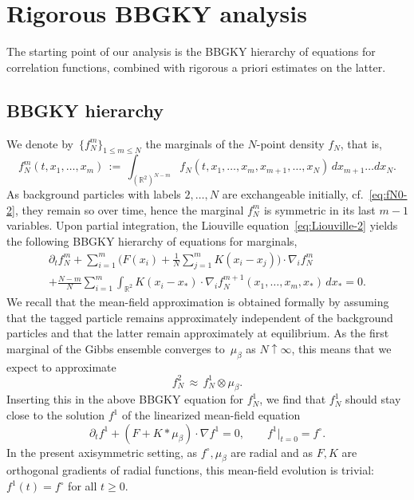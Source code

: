 \documentclass[a4paper,11pt,reqno,noindent]{amsart}
\theoremstyle{plain}
\numberwithin{equation}{section}
\newcommand{\R}{\mathbb R}
\newcommand{\3}{|\!|\!|}
\begin{document}
\section{Rigorous BBGKY analysis}

The starting point of our analysis is the BBGKY hierarchy of equations for correlation functions, combined with rigorous a priori estimates on the latter.

\subsection{BBGKY hierarchy}
We denote by~$\{f_N^m\}_{1\le m\le N}$ the marginals of the $N$-point density $f_N$, that is,
\begin{equation}\label{eq:def-fNm}
f_N^m(t,x_1,\ldots,x_m)\,:=\,\int_{(\R^2)^{N-m}}f_N(t,x_1,\ldots,x_m,x_{m+1},\ldots,x_N)\,dx_{m+1}\ldots dx_N.
\end{equation}
As background particles with labels $2,\ldots,N$ are exchangeable initially, cf.~\eqref{eq:fN0-2}, they remain so over time, hence the marginal $f_N^m$ is symmetric in its last $m-1$ variables.
Upon partial integration, the Liouville equation~\eqref{eq:Liouville-2} yields the following BBGKY hierarchy of equations for marginals,
\begin{multline}\label{eq:BBGKY-2}
\partial_tf_N^m+\sum_{i=1}^m\Big(F(x_i)+\tfrac1N\sum_{j=1}^mK(x_i-x_j)\Big)\cdot\nabla_if_N^m\\
+\tfrac{N-m}N\sum_{i=1}^m\int_{\R^2}K(x_i-x_*)\cdot\nabla_if_N^{m+1}(x_1,\ldots,x_m,x_*)\,dx_*=0.
\end{multline}
We recall that the mean-field approximation is obtained formally by assuming that the tagged particle remains approximately independent of the background particles and that the latter remain approximately at equilibrium. As the first marginal of the Gibbs ensemble converges to~$\mu_\beta$ as $N\uparrow\infty$, this means that we expect to approximate
\begin{equation}\label{eq:fN2-MF}
f_N^2\,\approx\, f_N^1\otimes\mu_\beta.
\end{equation}
Inserting this in the above BBGKY equation for $f_N^1$, we find that $f_N^1$ should stay close to the solution $f^1$ of the linearized mean-field equation
\begin{equation}\label{eq:lin-MFeqn}
\partial_tf^1+(F+K\ast\mu_\beta)\cdot\nabla f^1=0,\qquad f^1|_{t=0}=f^\circ.
\end{equation}
In the present axisymmetric setting, as $f^\circ,\mu_\beta$ are radial and as $F,K$ are orthogonal gradients of radial functions, this mean-field evolution is trivial: $f^1(t)=f^\circ$ for all $t\ge0$.
\end{document}
